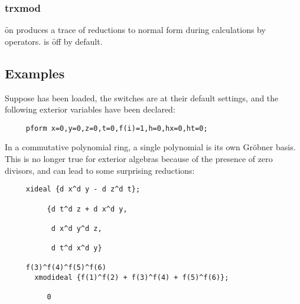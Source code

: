 \subsubsection*{trxmod}

\hypertarget{switch:TRXMOD}{}
\f{on}  produces a trace of reductions to normal form during
calculations by  operators.  is \f{off} by default.




\subsection{Examples}

Suppose  has been loaded, the switches are at their default settings,
and the following exterior variables have been declared:

\begin{verbatim}
     pform x=0,y=0,z=0,t=0,f(i)=1,h=0,hx=0,ht=0;
\end{verbatim}

In a commutative polynomial ring, a single polynomial is its own Gr{\"o}bner
basis. This is no longer true for exterior algebras because of the presence
of zero divisors, and can lead to some surprising reductions:
\begin{verbatim}
     xideal {d x^d y - d z^d t};

          {d t^d z + d x^d y,

           d x^d y^d z,

           d t^d x^d y}

     f(3)^f(4)^f(5)^f(6) 
       xmodideal {f(1)^f(2) + f(3)^f(4) + f(5)^f(6)};

          0
\end{verbatim}


